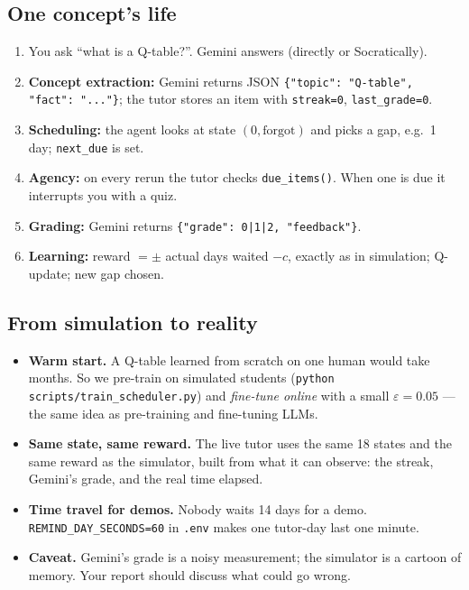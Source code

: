 \subsection{One concept's life}
\begin{enumerate}[leftmargin=1.4em]
  \item You ask ``what is a Q-table?''. Gemini answers (directly or Socratically).
  \item \textbf{Concept extraction:} Gemini returns JSON \texttt{\{"topic": "Q-table", "fact": "..."\}}; the tutor stores an item
        with \texttt{streak=0}, \texttt{last\_grade=0}.
  \item \textbf{Scheduling:} the agent looks at state $(0, \text{forgot})$ and picks a gap, e.g.\ 1 day; \texttt{next\_due} is set.
  \item \textbf{Agency:} on every rerun the tutor checks \texttt{due\_items()}. When one is due it interrupts you with a quiz.
  \item \textbf{Grading:} Gemini returns \texttt{\{"grade": 0|1|2, "feedback"\}}.
  \item \textbf{Learning:} reward $= \pm$ actual days waited $- c$, exactly as in simulation; Q-update; new gap chosen.
\end{enumerate}

\subsection{From simulation to reality}
\begin{itemize}
  \item \textbf{Warm start.} A Q-table learned from scratch on one human would take months. So we pre-train on simulated
        students (\texttt{python scripts/train\_scheduler.py}) and \emph{fine-tune online} with a small $\varepsilon = 0.05$ ---
        the same idea as pre-training and fine-tuning LLMs.
  \item \textbf{Same state, same reward.} The live tutor uses the same 18 states and the same reward as the simulator,
        built from what it can observe: the streak, Gemini's grade, and the real time elapsed.
  \item \textbf{Time travel for demos.} Nobody waits 14 days for a demo. \texttt{REMIND\_DAY\_SECONDS=60} in \texttt{.env}
        makes one tutor-day last one minute.
  \item \textbf{Caveat.} Gemini's grade is a noisy measurement; the simulator is a cartoon of memory. Your report should
        discuss what could go wrong.
\end{itemize}

